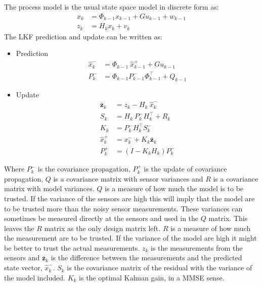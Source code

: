 The process model is the usual state space model in discrete form as:
\begin{align}
x_k &= \Phi_{k-1} x_{k-1} + G u_{k-1} + w_{k-1}\\
z_k &= H_k x_k + v_k
\end{align}
\noindent The \ac{LKF} prediction and update can be written as:
\begin{itemize}\tightlist
\item Prediction
\begin{align}
\hat x_k^- &= \Phi_{k-1}\ \hat x_{k-1}^+ + G u_{k-1} \\
P_k^- &= \Phi_{k-1}P_{k-1}^- \Phi_{k-1}^\top + Q_{k-1}
\end{align}
\item Update
\begin{align}
\bar{\mathbf{z}}_k &= z_k - H_k\ \hat x_k^-\\
S_k &= H_k\ P_k^-H_k^\top + R_k\\
K_k &= P_k^-H_k^\top S_k^-\\
\hat x_k^+ &= x_k^- + K_k \bar{\mathbf{z}}_k\\
P_k^+ &= (I - K_k H_k) P_k^-
\end{align}
\end{itemize}
%
Where $P_{k}^-$ is the covariance propagation, $P_{k}^+$ is the update of covariance propagation, $Q$ is a covariance matrix with sensor variances and $R$ is a covariance matrix with model variances. $Q$ is a measure of how much the model is to be trusted. If the variance of the sensors are high this will imply that the model are to be trusted more than the noisy sensor measurements. These variances can sometimes be measured directly at the sensors and used in the $Q$ matrix. This leaves the $R$ matrix as the only design matrix left. $R$ is a measure of how much the measurement are to be trusted. If the variance of the model are high it might be better to trust the actual measurements. $z_k$ is the measurements from the sensors and $\bar{\mathbf{z}}_k$ is the difference between the measurements and the predicted state vector, $\hat x_k^-$. $S_k$ is the covariance matrix of the residual with the variance of the model included. $K_k$ is the optimal Kalman gain, in a \ac{MMSE} sense. 

